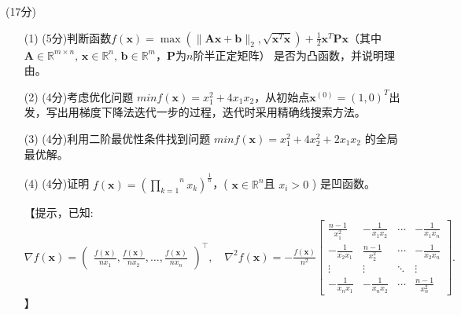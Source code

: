 \documentclass[12pt,a4paper,openany,twoside]{ctexbook}
\begin{document}
\begin{exercise}\quad(17分)
	\begin{itemize}
		\item [(1)](5分)判断函数$f(\mathbf{x}) = \max(\|\mathbf{A}\mathbf{x} + \mathbf{b}\|_2, \sqrt{{\mathbf{x}}^T \mathbf{x}} )+\frac{1}{2}{\mathbf{x}}^T\mathbf{P}\mathbf{x}$（其中$\mathbf{A} \in \mathbb{R}^{m \times n}, \, \mathbf{x} \in \mathbb{R}^n, \,\mathbf{b}  \in \mathbb{R}^m $，$\mathbf{P}$为$n$阶半正定矩阵） 是否为凸函数，并说明理由。
		\item [(2)](4分)考虑优化问题 $min f(\mathbf{x})=x_1^2+4x_1x_2$，从初始点$\mathbf{x}^{(0)}=(1,0)^T$出发，写出用梯度下降法迭代一步的过程，迭代时采用精确线搜索方法。
		\item [(3)](4分)利用二阶最优性条件找到问题 $minf(\mathbf{x})=x_1^2+4x_2^2+2x_1x_2$ 的全局最优解。
		\item [(4)](4分)证明 $f(\mathbf{x})=(\stackrel{n}{\underset{k=1}{\prod}}x_k)^{\frac{1}{n}}$，( $\mathbf{x}\in \mathbb{R}^{n}$且 $x_i>0$ ) 是凹函数。
		
		【提示，已知:\\ $\nabla f(\mathbf{x}) = \begin{pmatrix}
			\frac{f(\mathbf{x})}{n x_1}, \frac{f(\mathbf{x})}{n x_2}, \dots, \frac{f(\mathbf{x})}{n x_n}
			\end{pmatrix}^\top ,\quad\nabla^2 f(\mathbf{x}) =- \frac{f(\mathbf{x})}{n^2}
			\begin{bmatrix}
			\frac{n-1}{x_1^2} & -\frac{1}{x_1x_2} & \cdots & -\frac{1}{x_1x_n} \\
			-\frac{1}{x_2x_1} & \frac{n-1}{x_2^2} & \cdots & -\frac{1}{x_2x_n} \\
			\vdots & \vdots & \ddots & \vdots \\
			-\frac{1}{x_nx_1} & -\frac{1}{x_nx_2} & \cdots & \frac{n-1}{x_n^2}
			\end{bmatrix}.$】

	\end{itemize} 
\end{exercise}
\end{document}
